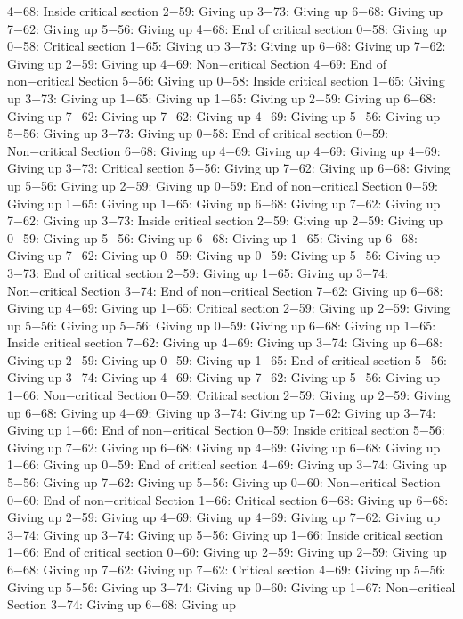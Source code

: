 4−68: Inside critical section
2−59: Giving up
3−73: Giving up
6−68: Giving up
7−62: Giving up
5−56: Giving up
4−68: End of critical section
0−58: Giving up
0−58: Critical section
1−65: Giving up
3−73: Giving up
6−68: Giving up
7−62: Giving up
2−59: Giving up
4−69: Non−critical Section
4−69: End of non−critical Section
5−56: Giving up
0−58: Inside critical section
1−65: Giving up
3−73: Giving up
1−65: Giving up
1−65: Giving up
2−59: Giving up
6−68: Giving up
7−62: Giving up
7−62: Giving up
4−69: Giving up
5−56: Giving up
5−56: Giving up
3−73: Giving up
0−58: End of critical section
0−59: Non−critical Section
6−68: Giving up
4−69: Giving up
4−69: Giving up
4−69: Giving up
3−73: Critical section
5−56: Giving up
7−62: Giving up
6−68: Giving up
5−56: Giving up
2−59: Giving up
0−59: End of non−critical Section
0−59: Giving up
1−65: Giving up
1−65: Giving up
6−68: Giving up
7−62: Giving up
7−62: Giving up
3−73: Inside critical section
2−59: Giving up
2−59: Giving up
0−59: Giving up
5−56: Giving up
6−68: Giving up
1−65: Giving up
6−68: Giving up
7−62: Giving up
0−59: Giving up
0−59: Giving up
5−56: Giving up
3−73: End of critical section
2−59: Giving up
1−65: Giving up
3−74: Non−critical Section
3−74: End of non−critical Section
7−62: Giving up
6−68: Giving up
4−69: Giving up
1−65: Critical section
2−59: Giving up
2−59: Giving up
5−56: Giving up
5−56: Giving up
0−59: Giving up
6−68: Giving up
1−65: Inside critical section
7−62: Giving up
4−69: Giving up
3−74: Giving up
6−68: Giving up
2−59: Giving up
0−59: Giving up
1−65: End of critical section
5−56: Giving up
3−74: Giving up
4−69: Giving up
7−62: Giving up
5−56: Giving up
1−66: Non−critical Section
0−59: Critical section
2−59: Giving up
2−59: Giving up
6−68: Giving up
4−69: Giving up
3−74: Giving up
7−62: Giving up
3−74: Giving up
1−66: End of non−critical Section
0−59: Inside critical section
5−56: Giving up
7−62: Giving up
6−68: Giving up
4−69: Giving up
6−68: Giving up
1−66: Giving up
0−59: End of critical section
4−69: Giving up
3−74: Giving up
5−56: Giving up
7−62: Giving up
5−56: Giving up
0−60: Non−critical Section
0−60: End of non−critical Section
1−66: Critical section
6−68: Giving up
6−68: Giving up
2−59: Giving up
4−69: Giving up
4−69: Giving up
7−62: Giving up
3−74: Giving up
3−74: Giving up
5−56: Giving up
1−66: Inside critical section
1−66: End of critical section
0−60: Giving up
2−59: Giving up
2−59: Giving up
6−68: Giving up
7−62: Giving up
7−62: Critical section
4−69: Giving up
5−56: Giving up
5−56: Giving up
3−74: Giving up
0−60: Giving up
1−67: Non−critical Section
3−74: Giving up
6−68: Giving up
